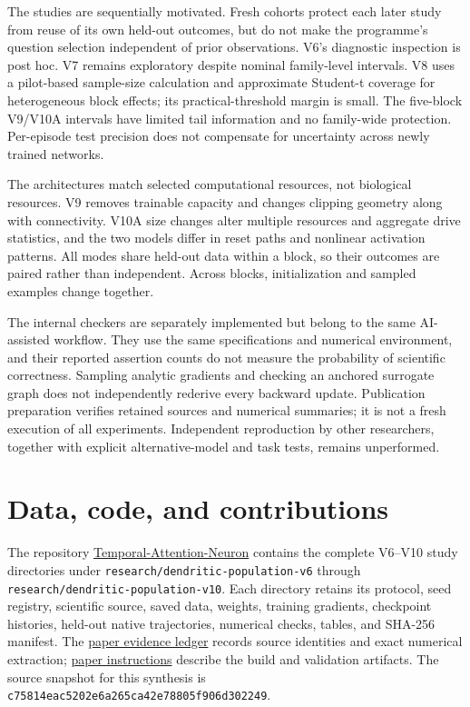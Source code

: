 \documentclass[
  10pt,
]{article}
\begin{document}
The studies are sequentially motivated. Fresh cohorts protect each later
study from reuse of its own held-out outcomes, but do not make the
programme's question selection independent of prior observations. V6's
diagnostic inspection is post hoc. V7 remains exploratory despite
nominal family-level intervals. V8 uses a pilot-based sample-size
calculation and approximate Student-t coverage for heterogeneous block
effects; its practical-threshold margin is small. The five-block V9/V10A
intervals have limited tail information and no family-wide protection.
Per-episode test precision does not compensate for uncertainty across
newly trained networks.

The architectures match selected computational resources, not biological
resources. V9 removes trainable capacity and changes clipping geometry
along with connectivity. V10A size changes alter multiple resources and
aggregate drive statistics, and the two models differ in reset paths and
nonlinear activation patterns. All modes share held-out data within a
block, so their outcomes are paired rather than independent. Across
blocks, initialization and sampled examples change together.

The internal checkers are separately implemented but belong to the same
AI-assisted workflow. They use the same specifications and numerical
environment, and their reported assertion counts do not measure the
probability of scientific correctness. Sampling analytic gradients and
checking an anchored surrogate graph does not independently rederive
every backward update. Publication preparation verifies retained sources
and numerical summaries; it is not a fresh execution of all experiments.
Independent reproduction by other researchers, together with explicit
alternative-model and task tests, remains unperformed.

\section{Data, code, and
contributions}\label{data-code-and-contributions}

The repository
\href{https://github.com/20171806011/Temporal-Attention-Neuron}{Temporal-Attention-Neuron}
contains the complete V6--V10 study directories under
\texttt{research/dendritic-population-v6} through
\texttt{research/dendritic-population-v10}. Each directory retains its
protocol, seed registry, scientific source, saved data, weights,
training gradients, checkpoint histories, held-out native trajectories,
numerical checks, tables, and SHA-256 manifest. The
\href{EVIDENCE.md}{paper evidence ledger} records source identities and
exact numerical extraction; \href{README.md}{paper instructions}
describe the build and validation artifacts. The source snapshot for
this synthesis is \texttt{c75814eac5202e6a265ca42e78805f906d302249}.
\end{document}
